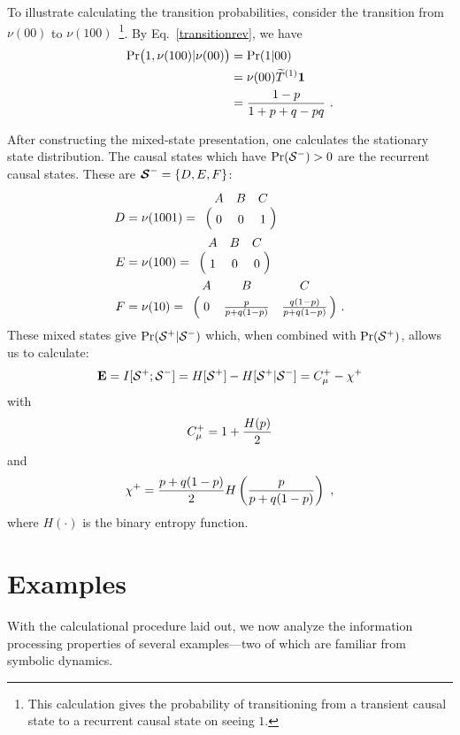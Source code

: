 To illustrate calculating the transition probabilities, consider the
transition from $\nu(00)$ to $\nu(100)$~\footnote{This calculation gives
the probability of transitioning from a transient causal state to a 
recurrent causal state on seeing $1$.}.  By Eq.~\eqref{transitionrev}, we have
\begin{align*}
\Pr\bigl(1, \nu(100) | \nu(00)\bigr)
  & = \Pr(1|00)  \\
  & = \nu(00) \widetilde{T}^{(1)} \mathbf{1}  \\
  & = \frac{1-p}{1+p+q-pq} ~.
\end{align*}

After constructing the mixed-state presentation, one calculates the stationary
state distribution. The causal states which have $\Pr({\mathcal{S}}^{-}) > 0$
are the recurrent causal states. These are ${\boldsymbol{\mathcal{S}}}^{-}=\{D, E, F\}$:
\begin{align*}
D &= \nu(1001) =
  \bordermatrix{
     & A & B & C \cr
     & 0 & 0 & 1
  }\\
E &= \nu(100) =
  \bordermatrix{
     & A & B & C \cr
     & 1 & 0 & 0
  }\\
F &= \nu(10) =
  \bordermatrix{
     & A & B & C \cr
     & 0 & \frac{p}{p + q(1-p)} & \frac{q(1-p)}{p + q(1-p)}
  } ~.
\end{align*}
These mixed states give $\Pr({\mathcal{S}}^{+}|{\mathcal{S}}^{-})$
which, when combined with $\Pr({\mathcal{S}}^{+})$, allows us to calculate:
\begin{equation*}
{\bf E} = I[{\mathcal{S}}^{+}; {\mathcal{S}}^{-}] 
    = H[{\mathcal{S}}^{+}] - H[{\mathcal{S}}^{+}|{\mathcal{S}}^{-}] 
    = C_\mu^{+} - \chi^{+}
\end{equation*}
with
\begin{equation*}
    C_\mu^{+} = 1 + \frac{H(p)}{2} 
\end{equation*}
and
\begin{equation*}
  \chi^{+} = \frac{p+q(1-p)}{2} H\left( \frac{p}{p+q(1-p)} \right) ~,
\end{equation*}
where $H(\cdot)$ is the binary entropy function.

\section{Examples}

With the calculational procedure laid out, we now analyze the information
processing properties of several examples---two of which are familiar from 
symbolic dynamics.

